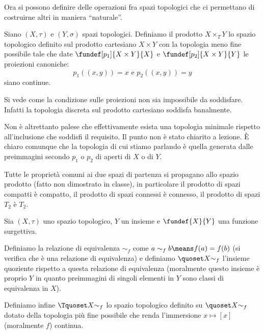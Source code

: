 Ora si possono definire delle operazioni fra spazi topologici che ci permettano di costruirne altri in maniera ``naturale''.

\begin{defn}
Siano $(X,\tau)$ e $(Y, \sigma)$ spazi topologici. Definiamo il prodotto $X\times_T Y$ lo spazio topologico definito sul prodotto cartesiano $X\times Y$ con la topologia meno fine possibile tale che date $\fundef[p_1]{X\times Y}{X}$ e $\fundef[p_2]{X\times Y}{Y}$ le proiezioni canoniche:
\begin{equation}
 p_1((x, y))=x \text{  e  } p_2((x, y))=y
\end{equation} 
siano continue.
\end{defn}

\begin{oss}
Si vede come la condizione sulle proiezioni non sia impossibile da soddisfare. Infatti la topologia discreta sul prodotto cartesiano soddisfa banalmente.

Non è altrettanto palese che effettivamente esista una topologia minimale rispetto all'inclusione che soddisfi il requisito. Il punto non è stato chiarito a lezione. È chiaro comunque che la topologia di cui stiamo parlando è quella generata dalle preimmagini secondo $p_1$ o $p_2$ di aperti di $X$ o di $Y$.
\end{oss}

\begin{oss}
Tutte le proprietà comuni ai due spazi di partenza si propagano allo spazio prodotto (fatto non dimostrato in classe), in particolare il prodotto di spazi compatti è compatto, il prodotto di spazi connessi è connesso, il prodotto di spazi $T_2$ è $T_2$.
\end{oss}

\begin{defn}
Sia $(X,\tau)$ uno spazio topologico, $Y$ un insieme e $\fundef{X}{Y}$ una funzione surgettiva.

Definiamo la relazione di equivalenza $\sim_f$ come $a\sim_f b \means f(a)=f(b)$ (si verifica che è una relazione di equivalenza) e definiamo $\quoset X{\sim_f}$ l'insieme quoziente rispetto a questa relazione di equivalenza (moralmente questo insieme è proprio $Y$ in quanto preimmagini di singoli elementi in $Y$ sono classi di equivalenza in $X$).

Definiamo infine $\Tquoset X{\sim_f}$ lo spazio topologico definito su $\quoset X{\sim_f}$ dotato della topologia più fine possibile che renda l'immersione $x \mapsto [x]$ (moralmente $f$) continua.
\end{defn}


